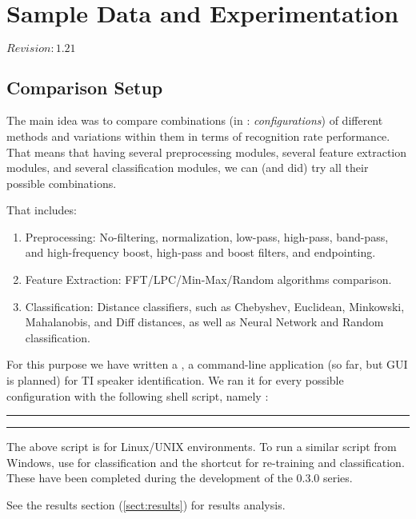 \chapter{Sample Data and Experimentation}

$Revision: 1.21 $



\section{Comparison Setup}

The main idea was to compare combinations (in {\marf}: {\it configurations})
of different methods and variations within them in terms of recognition
rate performance. That means that having several preprocessing modules, several feature
extraction modules, and several classification modules, we can (and did)
try all their possible combinations.

That includes:

\begin{enumerate}
	\item Preprocessing: No-filtering, normalization, low-pass, high-pass,
	      band-pass, and high-frequency boost, high-pass and boost filters,
	      and endpointing.
	\item Feature Extraction: FFT/LPC/Min-Max/Random algorithms comparison.
	\item Classification: Distance classifiers, such as Chebyshev, Euclidean,
	      Minkowski, Mahalanobis, and Diff distances, as well as Neural Network and Random
	      classification.
\end{enumerate}


For this purpose we have written a , a command-line application
(so far, but GUI is planned) for TI speaker identification. We ran it for every possible configuration
with the following shell script, namely :

\vspace{15pt}
\hrule
{\scriptsize }
\hrule
\vspace{15pt}

The above script is for Linux/UNIX environments. To run a similar script
from Windows, use  for classification and the 
shortcut for re-training and classification. These have been completed
during the development of the 0.3.0 series.

See the results section (\ref{sect:results}) for results analysis.

